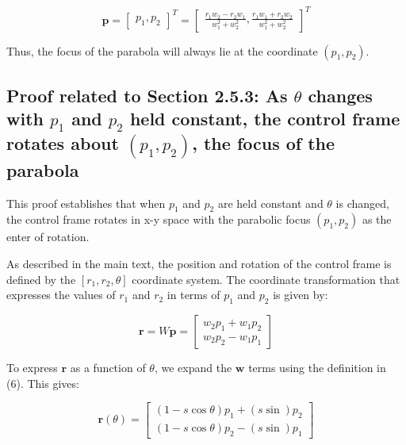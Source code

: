 \documentclass[11pt]{article}
\newcommand{\bs}[1]{\boldsymbol{#1}} %
\begin{document}
        \setcounter{equation}{23}
        \begin{equation}
            \bs{p} = \begin{bmatrix}p_1,p_2\end{bmatrix}^T = \begin{bmatrix}
                                                                \frac{r_1w_2 - r_2w_1}{w_1^2 + w_2^2},
                                                                \frac{r_1w_1 + r_2w_2}{w_1^2 + w_2^2}\end{bmatrix}^T
            \label{eq:Eq24}
        \end{equation}
    
        Thus, the focus of the parabola will always lie at the coordinate $(p_1,p_2)$.

    
    \subsection{Proof related to Section 2.5.3: As $\theta$ changes with $p_1$ and $p_2$ held constant, the control frame rotates about $(p_1,p_2)$, the focus of the parabola}
    
        This proof establishes that when $p_1$ and $p_2$ are held constant and $\theta$ is changed, the control frame rotates in x-y space with the parabolic focus $(p_1,p_2)$ as the enter of rotation.
    
        As described in the main text, the position and rotation of the control frame is defined by the $[r_1,r_2,\theta]$ coordinate system. The coordinate transformation that expresses the values of $r_1$ and $r_2$ in terms of $p_1$ and $p_2$ is given by:
    
        \setcounter{equation}{7}
        \begin{equation}
            \bs{r} = W\bs{p} = \begin{bmatrix} w_2p_1 + w_1p_2 \\ w_2p_2 - w_1p_1\end{bmatrix}
            \label{eq:Eq8}
        \end{equation}
    
        To express $\bs{r}$ as a function of $\theta$, we expand the $\bs{w}$ terms using the definition in (6). This gives:
    
        \setcounter{equation}{59}
        \begin{equation}
            \bs{r}(\theta) = \begin{bmatrix}    (1 - s\cos\theta)p_1 + (s\sin)p_2 \\ 
                                        (1 - s\cos\theta)p_2 - (s\sin)p_1\end{bmatrix}
            \label{eq:Eq60}
        \end{equation}
    
\end{document}
